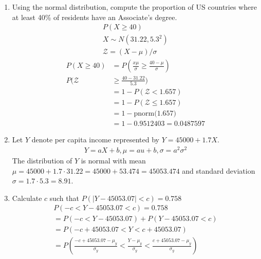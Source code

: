 \documentclass{article}
\begin{document}
\begin{enumerate}[label=\alph*)]
    \item Using the normal distribution, compute the proportion of US countries where at least 40\% of residents have an Associate's degree.
          \begin{align*}
              P(X \geq 40)           \\
              X \sim N(31.22, 5.3^2) \\
              \mathcal{Z} = (X - \mu)/\sigma
          \end{align*}
          \begin{align*}
              P(X \geq 40)  & = P(\frac{x\mu}{\sigma} \geq \frac{40-\mu}{\sigma}) \\
              P(\mathcal{Z} & \geq\frac{40-31.22}{5.3})                           \\
                            & = 1 - P(\mathcal{Z} < 1.657)                        \\
                            & = 1 - P(\mathcal{Z} \leq 1.657)                     \\
                            & = 1 - \text{pnorm(1.657)}                           \\
                            & = 1 - 0.9512403 = 0.0487597
          \end{align*}
    \item Let \(Y\) denote per capita income represented by \(Y = 45000 + 1.7X\). \\
          \begin{align*}
              Y = aX+b, \mu = au+b, \sigma = a^2\sigma^2
          \end{align*}
          The distribution of \(Y\) is normal with mean \(\mu = 45000 + 1.7\cdot 31.22 = 45000 + 53.474 = 45053.474\) and standard deviation \(\sigma = 1.7\cdot 5.3 = 8.91\).
    \item Calculate \(c\) such that \(P(|Y-45053.07| < c) = 0.758\)
          \begin{align*}
              P(-c < Y-45053.07 < c) = 0.758                                                                         \\
              = P(-c < Y-45053.07) + P(Y-45053.07 < c)                                                               \\
              = P(-c + 45053.07 < Y < c + 45053.07)                                                                  \\
              = P(\frac{-c+45053.07-\mu_y}{\sigma_y} < \frac{Y-\mu_y}{\sigma_y} < \frac{c+45053.07-\mu_y}{\sigma_y}) \\

\end{align*}
\end{enumerate}
\end{document}
